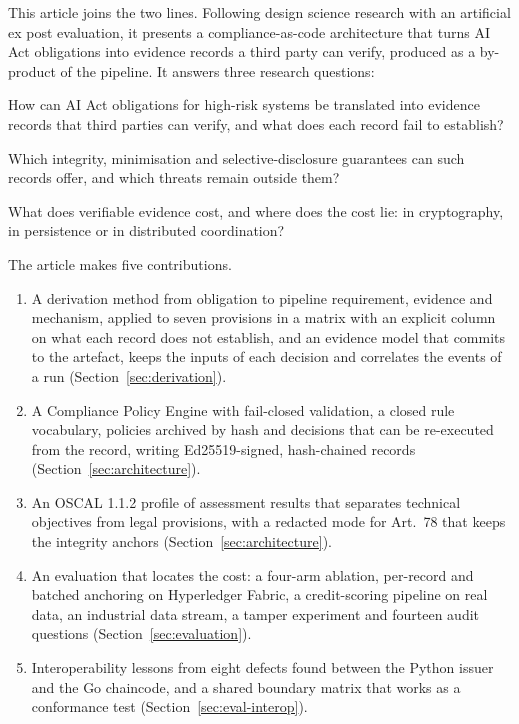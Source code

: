 This article joins the two lines. Following design science research with an artificial ex post evaluation, it presents a compliance-as-code architecture that turns AI Act obligations into evidence records a third party can verify, produced as a by-product of the pipeline. It answers three research questions:
\begin{description}[leftmargin=0pt, itemsep=2pt]
\item[RQ1.] How can AI Act obligations for high-risk systems be translated into evidence records that third parties can verify, and what does each record fail to establish?
\item[RQ2.] Which integrity, minimisation and selective-disclosure guarantees can such records offer, and which threats remain outside them?
\item[RQ3.] What does verifiable evidence cost, and where does the cost lie: in cryptography, in persistence or in distributed coordination?
\end{description}

The article makes five contributions.
\begin{enumerate}[label=C\arabic*., leftmargin=*, itemsep=2pt]
\item A derivation method from obligation to pipeline requirement, evidence and mechanism, applied to seven provisions in a matrix with an explicit column on what each record does not establish, and an evidence model that commits to the artefact, keeps the inputs of each decision and correlates the events of a run (Section~\ref{sec:derivation}).
\item A Compliance Policy Engine with fail-closed validation, a closed rule vocabulary, policies archived by hash and decisions that can be re-executed from the record, writing Ed25519-signed, hash-chained records (Section~\ref{sec:architecture}).
\item An OSCAL 1.1.2 profile of assessment results that separates technical objectives from legal provisions, with a redacted mode for Art.~78 that keeps the integrity anchors (Section~\ref{sec:architecture}).
\item An evaluation that locates the cost: a four-arm ablation, per-record and batched anchoring on Hyperledger Fabric, a credit-scoring pipeline on real data, an industrial data stream, a tamper experiment and fourteen audit questions (Section~\ref{sec:evaluation}).
\item Interoperability lessons from eight defects found between the Python issuer and the Go chaincode, and a shared boundary matrix that works as a conformance test (Section~\ref{sec:eval-interop}).
\end{enumerate}

